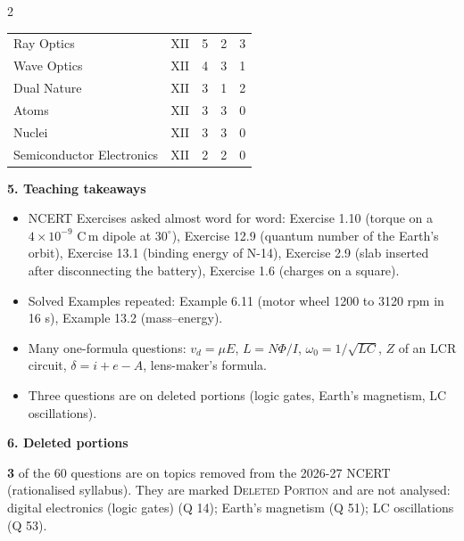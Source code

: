 \begin{multicols}{2}
{\begin{tabular}{@{}p{4.7cm}c@{\,}r@{\,}r@{\,}r@{}}
Ray Optics & XII & 5 & 2 & 3\\
Wave Optics & XII & 4 & 3 & 1\\
Dual Nature & XII & 3 & 1 & 2\\
Atoms & XII & 3 & 3 & 0\\
Nuclei & XII & 3 & 3 & 0\\
Semiconductor Electronics & XII & 2 & 2 & 0\\
\bottomrule\end{tabular}}\par\medskip
\textbf{\color{crimson}5. Teaching takeaways}\par\smallskip
{\footnotesize\begin{itemize}[leftmargin=1em,nosep]
\item NCERT Exercises asked almost word for word: Exercise 1.10 (torque on a $4\times10^{-9}$ C\,m dipole at $30^\circ$), Exercise 12.9 (quantum number of the Earth's orbit), Exercise 13.1 (binding energy of N-14), Exercise 2.9 (slab inserted after disconnecting the battery), Exercise 1.6 (charges on a square).
\item Solved Examples repeated: Example 6.11 (motor wheel 1200 to 3120 rpm in 16 s), Example 13.2 (mass--energy).
\item Many one-formula questions: $v_d=\mu E$, $L=N\Phi/I$, $\omega_0=1/\sqrt{LC}$, $Z$ of an LCR circuit, $\delta=i+e-A$, lens-maker's formula.
\item Three questions are on deleted portions (logic gates, Earth's magnetism, LC oscillations).
\end{itemize}}\par\medskip
\textbf{\color{crimson}6. Deleted portions}\par\smallskip
\textbf{3} of the 60 questions are on topics removed from the 2026-27 NCERT (rationalised syllabus). They are marked \textsc{Deleted Portion} and are not analysed: digital electronics (logic gates) (Q 14); Earth's magnetism (Q 51); LC oscillations (Q 53).\par
\end{multicols}







